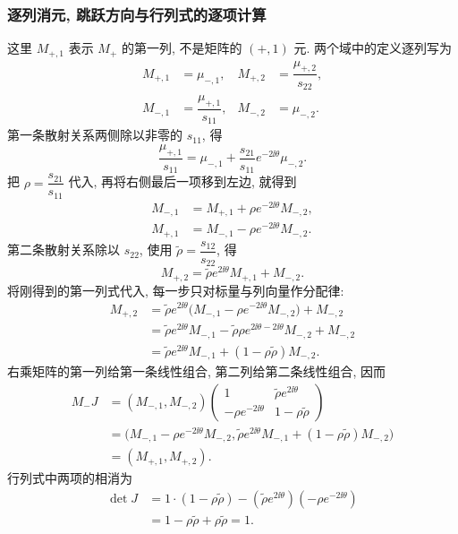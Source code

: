 \subsubsection*{逐列消元, 跳跃方向与行列式的逐项计算}
这里 $M_{+,1}$ 表示 $M_+$ 的第一列, 不是矩阵的 $(+,1)$ 元.
两个域中的定义逐列写为
\[
\begin{aligned}
M_{+,1}&=\mu_{-,1},&
M_{+,2}&=\dfrac{\mu_{+,2}}{s_{22}},\\
M_{-,1}&=\dfrac{\mu_{+,1}}{s_{11}},&
M_{-,2}&=\mu_{-,2}.
\end{aligned}
\]
第一条散射关系两侧除以非零的 $s_{11}$, 得
\[
\dfrac{\mu_{+,1}}{s_{11}}
=\mu_{-,1}
+\dfrac{s_{21}}{s_{11}}e^{-2\ii\theta}\mu_{-,2}.
\]
把 $\rho=\dfrac{s_{21}}{s_{11}}$ 代入, 再将右侧最后一项移到左边, 就得到
\[
\begin{aligned}
M_{-,1}
&=M_{+,1}+\rho e^{-2\ii\theta}M_{-,2},\\
M_{+,1}
&=M_{-,1}-\rho e^{-2\ii\theta}M_{-,2}.
\end{aligned}
\]
第二条散射关系除以 $s_{22}$, 使用 $\widetilde\rho=\dfrac{s_{12}}{s_{22}}$, 得
\[
M_{+,2}
=\widetilde\rho e^{2\ii\theta}M_{+,1}+M_{-,2}.
\]
将刚得到的第一列式代入, 每一步只对标量与列向量作分配律:
\[
\begin{aligned}
M_{+,2}
&=\widetilde\rho e^{2\ii\theta}
\bigl(M_{-,1}-\rho e^{-2\ii\theta}M_{-,2}\bigr)
+M_{-,2}\\
&=\widetilde\rho e^{2\ii\theta}M_{-,1}
-\widetilde\rho\rho e^{2\ii\theta-2\ii\theta}M_{-,2}
+M_{-,2}\\
&=\widetilde\rho e^{2\ii\theta}M_{-,1}
+(1-\rho\widetilde\rho)M_{-,2}.
\end{aligned}
\]
右乘矩阵的第一列给第一条线性组合, 第二列给第二条线性组合, 因而
\[
\begin{aligned}
M_-J
&=(M_{-,1},M_{-,2})
\begin{pmatrix}
1&\widetilde\rho e^{2\ii\theta}\\
-\rho e^{-2\ii\theta}&1-\rho\widetilde\rho
\end{pmatrix}\\
&=\bigl(
M_{-,1}-\rho e^{-2\ii\theta}M_{-,2},
\widetilde\rho e^{2\ii\theta}M_{-,1}
+(1-\rho\widetilde\rho)M_{-,2}
\bigr)\\
&=(M_{+,1},M_{+,2}).
\end{aligned}
\]
行列式中两项的相消为
\[
\begin{aligned}
\det J
&=1\cdot(1-\rho\widetilde\rho)
-(\widetilde\rho e^{2\ii\theta})
(-\rho e^{-2\ii\theta})\\
&=1-\rho\widetilde\rho+\rho\widetilde\rho=1.
\end{aligned}
\]
